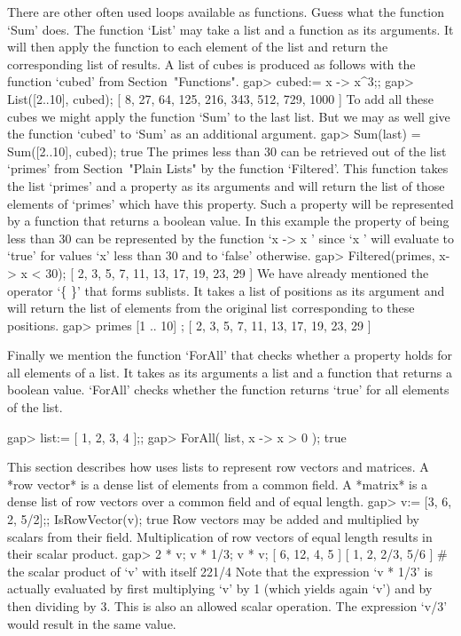 There are other often used loops available as functions.   Guess what the
function `Sum' does.  The function `List' may  take a list and a function
as its arguments.  It will then apply the function to each element of the
list  and return  the corresponding list of results.   A list of cubes is
produced as follows with the function `cubed' from Section~"Functions".
\beginexample
    gap> cubed:= x -> x^3;;
    gap> List([2..10], cubed);
    [ 8, 27, 64, 125, 216, 343, 512, 729, 1000 ] 
\endexample
To add all these cubes  we might apply the  function  `Sum' to  the  last
list.  But we may  as well  give the  function  `cubed' to  `Sum'  as  an
additional argument.
\beginexample
    gap> Sum(last) = Sum([2..10], cubed);
    true 
\endexample
The  primes less than 30 can  be retrieved out  of the list `primes' from
Section~"Plain Lists" by the function `Filtered'. This function takes the
list `primes' and a property as its arguments and will return the list of
those elements of `primes' which have this property. Such a property will
be represented  by  a function  that  returns  a boolean  value. In  this
example the property  of  being less than  30 can be represented  by  the
function `x  -> x ' since `x ' will evaluate to `true'  for
values `x' less than 30 and to `false' otherwise.
\beginexample
    gap> Filtered(primes, x-> x < 30);
    [ 2, 3, 5, 7, 11, 13, 17, 19, 23, 29 ] 
\endexample
We have already  mentioned the operator `\{  \}' that  forms sublists. It
takes a  list of positions  as its argument  and will return  the list of
elements from the original list corresponding to these positions.
\beginexample
    gap> primes{ [1 .. 10] };
    [ 2, 3, 5, 7, 11, 13, 17, 19, 23, 29 ] 
\endexample

Finally we mention the function `ForAll' that checks whether a property
holds for all elements of a list. It takes as its arguments  a list and a 
function that returns a boolean value. `ForAll' checks whether the
function returns `true' for all elements of the list.

\beginexample
    gap> list:= [ 1, 2, 3, 4 ];;
    gap> ForAll( list, x -> x > 0 );
    true
\endexample

 


%
This section describes how {\GAP} uses lists to represent row vectors and
matrices. A *row vector* is a dense list of elements from a common field.
A *matrix* is a dense list of row vectors over a common field and of
equal length.
\beginexample
    gap> v:= [3, 6, 2, 5/2];;  IsRowVector(v);
    true
\endexample
Row vectors  may be  added and multiplied   by scalars from  their field.
Multiplication of   row vectors of  equal length  results in their scalar
product.
\beginexample
    gap> 2 * v;  v * 1/3;  v * v;
    [ 6, 12, 4, 5 ]
    [ 1, 2, 2/3, 5/6 ]
    # the scalar product of `v' with itself
    221/4
\endexample
Note  that   the expression `v   *  1/3' is   actually evaluated by first
multiplying `v' by 1 (which yields again `v')  and by then dividing by 3.
This  is  also an allowed scalar   operation.  The expression `v/3' would
result in  the same value.

